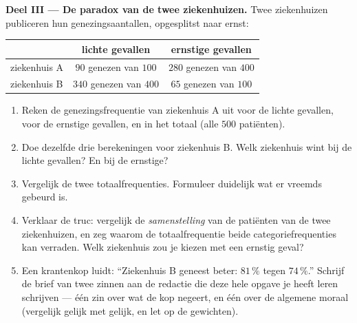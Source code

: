 \begin{problem}
\medskip
\noindent\textbf{Deel III --- De paradox van de twee ziekenhuizen.}
Twee ziekenhuizen publiceren hun genezingsaantallen, opgesplitst naar ernst:
\begin{center}
\renewcommand{\arraystretch}{1.3}
\begin{tabular}{l|cc}
 & lichte gevallen & ernstige gevallen \\
\hline
ziekenhuis A & $90$ genezen van $100$ & $280$ genezen van $400$ \\
ziekenhuis B & $340$ genezen van $400$ & $65$ genezen van $100$ \\
\end{tabular}
\end{center}
\begin{enumerate}[resume]
  \item Reken de genezingsfrequentie van ziekenhuis A uit voor de lichte gevallen,
        voor de ernstige gevallen, en in het totaal (alle $500$ patiënten).
  \item Doe dezelfde drie berekeningen voor ziekenhuis B. Welk ziekenhuis wint bij
        de lichte gevallen? En bij de ernstige?
  \item Vergelijk de twee totaalfrequenties. Formuleer duidelijk wat er vreemds
        gebeurd is.
  \item Verklaar de truc: vergelijk de \emph{samenstelling} van de patiënten van de
        twee ziekenhuizen, en zeg waarom de totaalfrequentie beide
        categoriefrequenties kan verraden. Welk ziekenhuis zou je kiezen met een
        ernstig geval?
  \item Een krantenkop luidt: ``Ziekenhuis B geneest beter: $81\,\%$ tegen
        $74\,\%$.'' Schrijf de brief van twee zinnen aan de redactie die deze hele
        opgave je heeft leren schrijven --- één zin over wat de kop negeert, en één
        over de algemene moraal (vergelijk gelijk met gelijk, en let op de
        gewichten).
\end{enumerate}
\end{problem}
